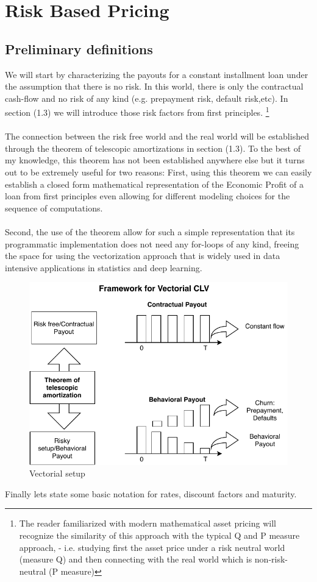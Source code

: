 
\chapter{Risk Based Pricing}
\section{ Preliminary definitions} 
We will start by characterizing the payouts for a constant installment loan under the assumption that there is no risk. In this world, there is only the contractual cash-flow and no risk of any kind (e.g. prepayment risk, default risk,etc). In section (1.3) we will introduce those risk factors from first principles.
\footnote{The reader familiarized with modern mathematical asset pricing will recognize the similarity of this approach with the typical Q and P measure approach, - i.e. studying first the asset price under a risk neutral world (measure Q) and then connecting with the real world which is non-risk-neutral (P measure) }
\\
\\
The connection between the risk free world and the real world will be established through the theorem of telescopic amortizations in section (1.3). To the best of my knowledge, this theorem has not been established anywhere else but it turns out to be extremely useful for two reasons: First, using this theorem we can easily establish a closed form mathematical representation of the Economic Profit of a loan from first principles even allowing for different modeling choices for the sequence of computations. 
\\ 
\\
Second, the use of the theorem allow for such a simple representation that its programmatic implementation does not need any for-loops of any kind, freeing the space for using the vectorization approach that is widely used in data intensive applications in statistics and deep learning.

\begin{figure}[H]
  \centering
      \includegraphics[width=1\textwidth]{ProofDiagram.pdf} 
 \caption{Vectorial setup}
 \label{fig:Test2}
\end{figure}
Finally lets state some basic notation for rates, discount factors and maturity.

